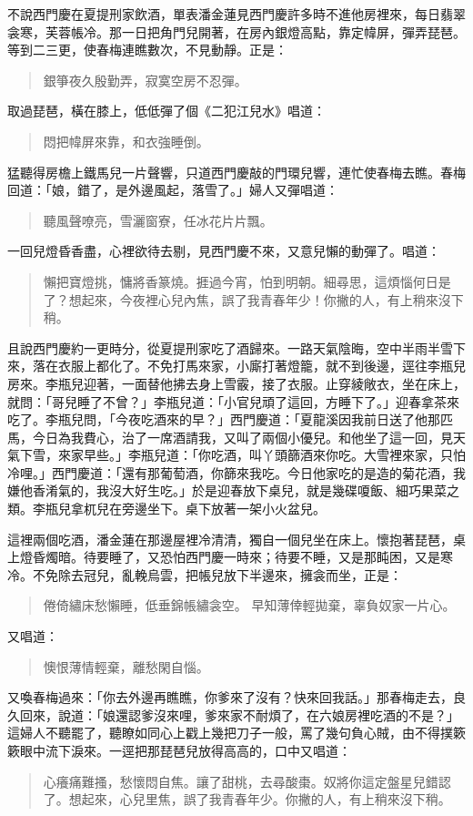 不說西門慶在夏提刑家飲酒，單表潘金蓮見西門慶許多時不進他房裡來，每日翡翠衾寒，芙蓉帳冷。那一日把角門兒開著，在房內銀燈高點，靠定幃屏，彈弄琵琶。等到二三更，使春梅連瞧數次，不見動靜。正是：
\begin{quote}
銀箏夜久殷勤弄，寂寞空房不忍彈。
\end{quote}
取過琵琶，橫在膝上，低低彈了個《二犯江兒水》唱道：
\begin{quote}
悶把幃屏來靠，和衣強睡倒。
\end{quote}

猛聽得房檐上鐵馬兒一片聲響，只道西門慶敲的門環兒響，連忙使春梅去瞧。春梅回道：「娘，錯了，是外邊風起，落雪了。」婦人又彈唱道：
\begin{quote}
聽風聲嘹亮，雪灑窗寮，任冰花片片飄。
\end{quote}

一回兒燈昏香盡，心裡欲待去剔，見西門慶不來，又意兒懶的動彈了。唱道：
\begin{quote}
懶把寶燈挑，慵將香篆燒。捱過今宵，怕到明朝。細尋思，這煩惱何日是了？想起來，今夜裡心兒內焦，誤了我青春年少！你撇的人，有上稍來沒下稍。
\end{quote}

且說西門慶約一更時分，從夏提刑家吃了酒歸來。一路天氣陰晦，空中半雨半雪下來，落在衣服上都化了。不免打馬來家，小廝打著燈籠，就不到後邊，逕往李瓶兒房來。李瓶兒迎著，一面替他拂去身上雪霰，接了衣服。止穿綾敞衣，坐在床上，就問：「哥兒睡了不曾？」李瓶兒道：「小官兒頑了這回，方睡下了。」迎春拿茶來吃了。李瓶兒問，「今夜吃酒來的早？」西門慶道：「夏龍溪因我前日送了他那匹馬，今日為我費心，治了一席酒請我，又叫了兩個小優兒。和他坐了這一回，見天氣下雪，來家早些。」李瓶兒道：「你吃酒，叫丫頭篩酒來你吃。大雪裡來家，只怕冷哩。」西門慶道：「還有那葡萄酒，你篩來我吃。今日他家吃的是造的菊花酒，我嫌他香淆氣的，我沒大好生吃。」於是迎春放下桌兒，就是幾碟嗄飯、細巧果菜之類。李瓶兒拿杌兒在旁邊坐下。桌下放著一架小火盆兒。

這裡兩個吃酒，潘金蓮在那邊屋裡冷清清，獨自一個兒坐在床上。懷抱著琵琶，桌上燈昏燭暗。待要睡了，又恐怕西門慶一時來；待要不睡，又是那盹困，又是寒冷。不免除去冠兒，亂輓烏雲，把帳兒放下半邊來，擁衾而坐，正是：
\begin{quote}
倦倚繡床愁懶睡，低垂錦帳繡衾空。
早知薄倖輕拋棄，辜負奴家一片心。
\end{quote}

又唱道：
\begin{quote}
懊恨薄情輕棄，離愁閑自惱。
\end{quote}

又喚春梅過來：「你去外邊再瞧瞧，你爹來了沒有？快來回我話。」那春梅走去，良久回來，說道：「娘還認爹沒來哩，爹來家不耐煩了，在六娘房裡吃酒的不是？」這婦人不聽罷了，聽瞭如同心上戳上幾把刀子一般，罵了幾句負心賊，由不得撲簌簌眼中流下淚來。一逕把那琵琶兒放得高高的，口中又唱道：
\begin{quote}
心癢痛難搔，愁懷悶自焦。讓了甜桃，去尋酸棗。奴將你這定盤星兒錯認了。想起來，心兒里焦，誤了我青春年少。你撇的人，有上稍來沒下稍。
\end{quote}

